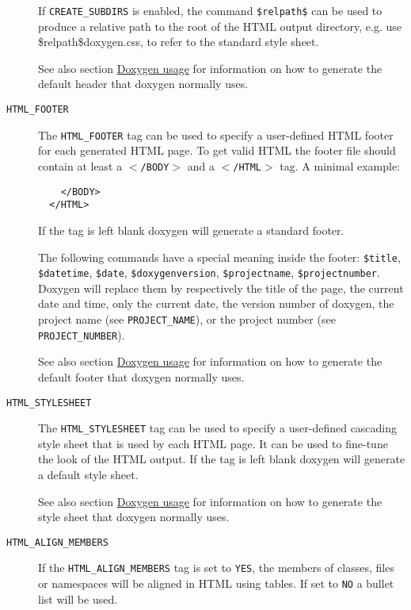 \begin{description}
If {\tt CREATE\_\-SUBDIRS} is enabled, the command {\tt \$relpath\$} can be used to produce a relative path to the root of the HTML output directory, e.g. use \$relpath\$doxygen.css, to refer to the standard style sheet.

See also section \hyperlink{doxygen_usage}{Doxygen usage} for information on how to generate the default header that doxygen normally uses.

\label{config_cfg_html_footer}
\hypertarget{config_cfg_html_footer}{}
 \item[{\tt HTML\_\-FOOTER} ] The {\tt HTML\_\-FOOTER} tag can be used to specify a user-defined HTML footer for each generated HTML page. To get valid HTML the footer file should contain at least a {\tt $<$/BODY$>$} and a {\tt $<$/HTML$>$} tag. A minimal example: 

\footnotesize\begin{verbatim}
    </BODY>
  </HTML>
\end{verbatim}
\normalsize
 If the tag is left blank doxygen will generate a standard footer.

The following commands have a special meaning inside the footer: {\tt \$title}, {\tt \$datetime}, {\tt \$date}, {\tt \$doxygenversion}, {\tt \$projectname}, {\tt \$projectnumber}. Doxygen will replace them by respectively the title of the page, the current date and time, only the current date, the version number of doxygen, the project name (see {\tt PROJECT\_\-NAME}), or the project number (see {\tt PROJECT\_\-NUMBER}).

See also section \hyperlink{doxygen_usage}{Doxygen usage} for information on how to generate the default footer that doxygen normally uses.

\label{config_cfg_html_stylesheet}
\hypertarget{config_cfg_html_stylesheet}{}
 \item[{\tt HTML\_\-STYLESHEET} ] The {\tt HTML\_\-STYLESHEET} tag can be used to specify a user-defined cascading style sheet that is used by each HTML page. It can be used to fine-tune the look of the HTML output. If the tag is left blank doxygen will generate a default style sheet.

See also section \hyperlink{doxygen_usage}{Doxygen usage} for information on how to generate the style sheet that doxygen normally uses.

\label{config_cfg_html_align_members}
\hypertarget{config_cfg_html_align_members}{}
 \item[{\tt HTML\_\-ALIGN\_\-MEMBERS} ] If the {\tt HTML\_\-ALIGN\_\-MEMBERS} tag is set to {\tt YES}, the members of classes, files or namespaces will be aligned in HTML using tables. If set to {\tt NO} a bullet list will be used.


\end{description}
